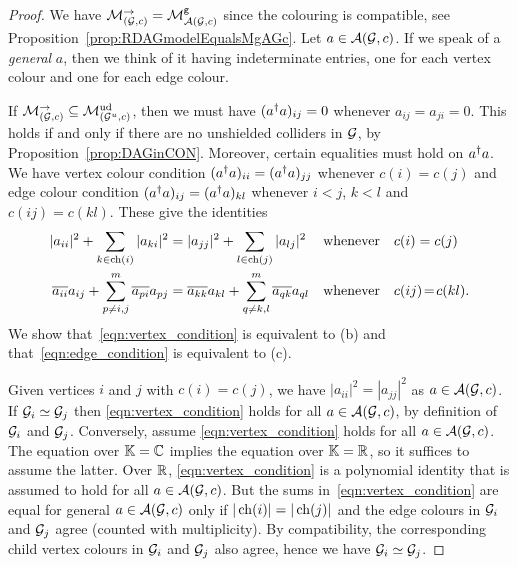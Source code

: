 \begin{proof} %
	We have $\mathcal{M}_{(\mathcal{G}, c)}^{\to} = \mathcal{M}^{\mathtt{g}}_{\mathcal{A}(\mathcal{G}, c)}$ since the colouring is compatible, see Proposition~\ref{prop:RDAGmodelEqualsMgAGc}. Let $a \in \mathcal{A}(\mathcal{G}, c)$. If we speak of a \emph{general} $a$, then we think of it having indeterminate entries, one for each vertex colour and one for each edge colour.
	
	If $\mathcal{M}_{(\mathcal{G}, c)}^{\to} \subseteq \mathcal{M}^{\mathrm{ud}}_{(\mathcal{G}^u, c)}$, then we must have $(a^{\dagger} a)_{ij} = 0$ whenever $a_{ij} = a_{ji} = 0$.  This holds if and only if there are no unshielded colliders in $\mathcal{G}$, by Proposition~\ref{prop:DAGinCON}. Moreover, certain equalities must hold on $a^{\dagger} a$. We have vertex colour condition $(a^{\dagger} a)_{ii} = (a^{\dagger} a)_{jj}$ whenever $c(i) = c(j)$ and edge colour condition $(a^{\dagger} a)_{ij} = (a^{\dagger} a)_{kl}$ whenever $i<j$, $k<l$ and $c(ij) = c(kl)$. These give the identities
	\begin{align}
		\label{eqn:vertex_condition} |a_{ii}|^2 + \sum_{k \in {\rm ch}(i)} |a_{ki}|^2 & = |a_{jj}|^2 + \sum_{l \in {\rm ch}(j)} |a_{lj}|^2  & &\text{whenever} \quad c(i) = c(j) \\
		\label{eqn:edge_condition} \overline{a_{ii}} a_{ij} + \sum_{p \neq i,j}^m \overline{a_{pi}} a_{pj} & =  \overline{a_{kk}} a_{kl} + \sum_{q \neq k,l}^m \overline{a_{qk}} a_{ql} & &\text{whenever} \quad c(ij) \! = \! c(kl). 
	\end{align} 
	We show that~\eqref{eqn:vertex_condition} is equivalent to (b) and that~\eqref{eqn:edge_condition} is equivalent to (c).
	
	Given vertices $i$ and $j$ with $c(i) = c(j)$, we have $|a_{ii}|^2 = |a_{jj}|^2$ as $a \in \mathcal{A}(\mathcal{G}, c)$.
	If $\mathcal{G}_i \simeq \mathcal{G}_j$ then \eqref{eqn:vertex_condition} holds for all $a \in \mathcal{A}(\mathcal{G}, c)$, by definition of $\mathcal{G}_i$ and $\mathcal{G}_j$. Conversely, assume \eqref{eqn:vertex_condition} holds for all $a \in \mathcal{A}(\mathcal{G}, c)$. The equation over $\mathbb K = \mathbb C$ implies the equation over $\mathbb K = \mathbb R$, so it suffices to assume the latter. Over $\mathbb R$, \eqref{eqn:vertex_condition} is a polynomial identity that is assumed to hold for all $a \in \mathcal{A}(\mathcal{G}, c)$.
	But the sums in~\eqref{eqn:vertex_condition} are equal for general $a \in \mathcal{A}(\mathcal{G}, c)$ only if $\vert \operatorname{ch}(i) \vert = \vert \operatorname{ch}(j) \vert$ and the edge colours in $\mathcal{G}_i$ and $\mathcal{G}_j$ agree (counted with multiplicity). By compatibility, the corresponding child vertex colours in $\mathcal{G}_i$ and $\mathcal{G}_j$ also agree, hence we have $\mathcal{G}_i \simeq \mathcal{G}_j$.
	

\end{proof}
